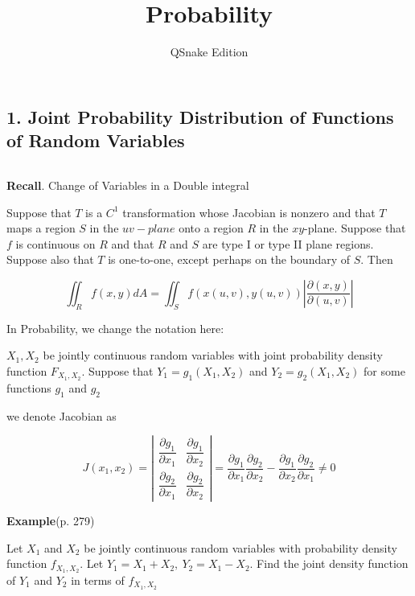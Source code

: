 


\title{Probability}

\author{QSnake Edition}

\maketitle

\subsection*{1. Joint Probability Distribution of Functions of Random Variables}$ $

\textbf{Recall}. Change of Variables in a Double integral

Suppose that $T$ is a $C^1$ transformation whose Jacobian is nonzero and that $T$ maps a region $S$ in the $uv-plane$ onto a region $R$ in the $xy$-plane. Suppose that $f$ is continuous on $R$ and that $R$ and $S$ are type I or type II plane regions. Suppose also that $T$ is one-to-one, except perhaps on the boundary of $S$. Then

$$\iint_R f(x,y)dA = \iint_S f(x(u,v),y(u,v))\left|  \dfrac{\partial(x,y)}{\partial(u,v)} \right|$$



In Probability, we change the notation here:

$X_1,X_2$ be jointly continuous random variables with joint probability density function $F_{X_1,X_2}$. Suppose that $Y_1 = g_1(X_1,X_2)$ and $Y_2 = g_2(X_1,X_2)$ for some functions $g_1$ and $g_2$

we denote Jacobian as

$$J(x_1,x_2) = \left| \begin{matrix}
	\dfrac{\partial g_1}{\partial x_1} & \dfrac{\partial g_1}{\partial x_2} \\
	\dfrac{\partial g_2}{\partial x_1} & \dfrac{\partial g_2}{\partial x_2}
\end{matrix} \right| = \dfrac{\partial g_1}{\partial x_1}\dfrac{\partial g_2}{\partial x_2} - \dfrac{\partial g_1}{\partial x_2}\dfrac{\partial g_2}{\partial x_1} \neq 0$$

\textbf{Example}(p. 279)

Let $X_1$ and $X_2$ be jointly continuous random variables with probability density function $f_{X_1,X_2}$. Let $Y_1 = X_1 + X_2,~Y_2 = X_1 - X_2$. Find the joint density function of $Y_1$ and $Y_2$ in terms of $f_{X_1,X_2}$

\newpage

